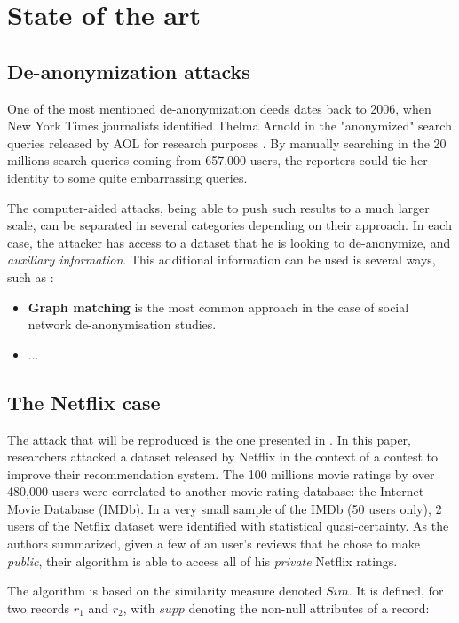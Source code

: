 \section{State of the art}\label{sec:state}

\subsection{De-anonymization attacks}

One of the most mentioned de-anonymization deeds dates back to 2006, when New York Times journalists identified Thelma Arnold in the "anonymized" search queries released by AOL for research purposes \cite{nytimes}. By manually searching in the 20 millions search queries coming from 657,000 users, the reporters could tie her identity to some quite embarrassing queries.

The computer-aided attacks, being able to push such results to a much larger scale, can be separated in several categories depending on their approach. In each case, the attacker has access to a dataset that he is looking to de-anonymize, and \textit{auxiliary information}. This additional information can be used is several ways, such as \cite{survey}:

\begin{itemize}
	\item \textbf{Graph matching} is the most common approach in the case of social network de-anonymisation studies. 
	\item ...
\end{itemize}

\subsection{The Netflix case}

The attack that will be reproduced is the one presented in \cite{netflix}. In this paper, researchers attacked a dataset released by Netflix in the context of a contest to improve their recommendation system. The 100 millions movie ratings by over 480,000 users were correlated to another movie rating database: the Internet Movie Database (IMDb). In a very small sample of the IMDb (50 users only), 2 users of the Netflix dataset were identified with statistical quasi-certainty. As the authors summarized, given a few of an user's reviews that he chose to make \textit{public}, their algorithm is able to access all of his \textit{private} Netflix ratings. 

The algorithm is based on the similarity measure denoted $Sim$. It is defined, for two records $r_1$ and $r_2$, with $supp$ denoting the non-null attributes of a record:

